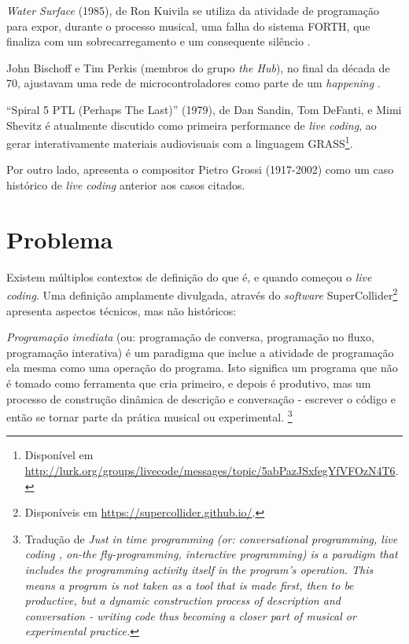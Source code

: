 \emph{Water Surface} (1985), de Ron Kuivila  se utiliza da atividade de programação para expor, durante o processo musical, uma falha do sistema FORTH, que finaliza com um sobrecarregamento e um consequente silêncio \cite{toplapcd_001_2007,collins_origins_2014}. 

John Bischoff e Tim Perkis (membros do grupo \emph{the Hub}), no final da década de 70, ajustavam uma rede de microcontroladores como parte de um \emph{happening} \cite{brown_indigenous_2013}.  

``Spiral 5 PTL (Perhaps The Last)'' (1979), de Dan Sandin, Tom DeFanti, e Mimi Shevitz é atualmente discutido como primeira performance de \emph{live coding}, ao gerar interativamente materiais audiovisuais com a linguagem GRASS\footnote{Disponível em \url{http://lurk.org/groups/livecode/messages/topic/5abPazJSxfegYfVFOzN4T6}.}. 

Por outro lado,  apresenta o compositor Pietro Grossi (1917-2002) como um caso histórico de \emph{live coding} anterior aos casos citados. %

\section*{Problema}

Existem múltiplos contextos de definição do que é, e quando começou o \emph{live coding}. Uma definição amplamente divulgada, através do \emph{software} SuperCollider\footnote{Disponíveis em \url{https://supercollider.github.io/}.} apresenta aspectos técnicos, mas não históricos:

\begin{citacao}
\emph{Programação imediata} (ou: programação de conversa, programação no fluxo, programação interativa) é um paradigma que inclue a atividade de programação ela mesma como uma operação do programa. Isto significa um programa que não é tomado como ferramenta que cria primeiro, e depois é produtivo, mas um processo de construção dinâmica de descrição e conversação - escrever o código e então se tornar parte da prática musical ou experimental. \cite[Verbete JITLib]{supercollider.org_supercollider_2014}\footnote{Tradução de \emph{Just in time programming (or: conversational programming, live coding , on-the fly-programming, interactive programming) is a paradigm that includes the programming activity itself in the program's operation. This means a program is not taken as a tool that is made first, then to be productive, but a dynamic construction process of description and conversation - writing code thus becoming a closer part of musical or experimental practice.}}
\end{citacao}

